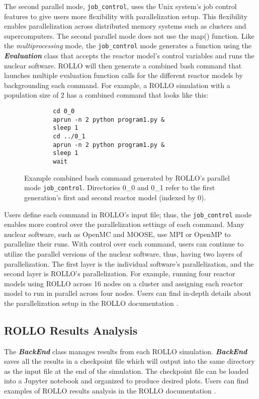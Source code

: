 The second parallel mode, \texttt{job\_control}, uses the Unix system's job control 
features to give users more flexibility with parallelization setup. 
This flexibility enables parallelization across distributed memory systems such as 
clusters and supercomputers. 
The second parallel mode does not use the map() function. 
Like the \textit{multiprocessing} mode, the \texttt{job\_control} mode generates a 
function using the \textbf{\textit{Evaluation}} class that accepts the reactor model's control 
variables and runs the nuclear software. 
\gls{ROLLO} will then generate a combined bash command that launches multiple evaluation 
function calls for the different reactor models by backgrounding each command.
For example, a ROLLO simulation with a population size of 2 has a combined command that
looks like this:
\begin{figure}[H]
    \centering
    \begin{minipage}{0.5\textwidth}
    \begin{verbatim}
        cd 0_0
        aprun -n 2 python program1.py &
        sleep 1 
        cd ../0_1 
        aprun -n 2 python program1.py &
        sleep 1 
        wait
    \end{verbatim}
    \end{minipage}
    \caption{Example combined bash command generated by \gls{ROLLO}'s parallel mode 
    \texttt{job\_control}. Directories 0_0 and 0_1 refer to the first generation's first 
    and second reactor model (indexed by 0).}
    \label{fig:job-control-example}
\end{figure}
Users define each command in ROLLO's input file; thus, the \texttt{job\_control} mode enables 
more control over the parallelization settings of each command. 
Many nuclear software, such as OpenMC and MOOSE, use \gls{MPI} or OpenMP to parallelize their runs. 
With control over each command, users can continue to utilize the parallel 
versions of the nuclear software, thus, having two layers of parallelization. 
The first layer is the individual software's parallelization, and the second layer is ROLLO's parallelization. 
For example, running four reactor models using ROLLO across 16 nodes on a cluster and assigning each reactor 
model to run in parallel across four nodes. 
Users can find in-depth details about the parallelization setup in the ROLLO documentation
 \cite{chee_documentation_2021}.

\subsection{ROLLO Results Analysis}
The \textbf{\textit{BackEnd}} class manages results from each \gls{ROLLO} simulation. 
\textbf{\textit{BackEnd}} saves all the results in a checkpoint file which will output 
into the same directory as the input file at the end of the simulation. 
The checkpoint file can be loaded into a Jupyter notebook and organized 
to produce desired plots. 
Users can find examples of \gls{ROLLO} results analysis in the \gls{ROLLO} documentation
\cite{chee_documentation_2021}. 

